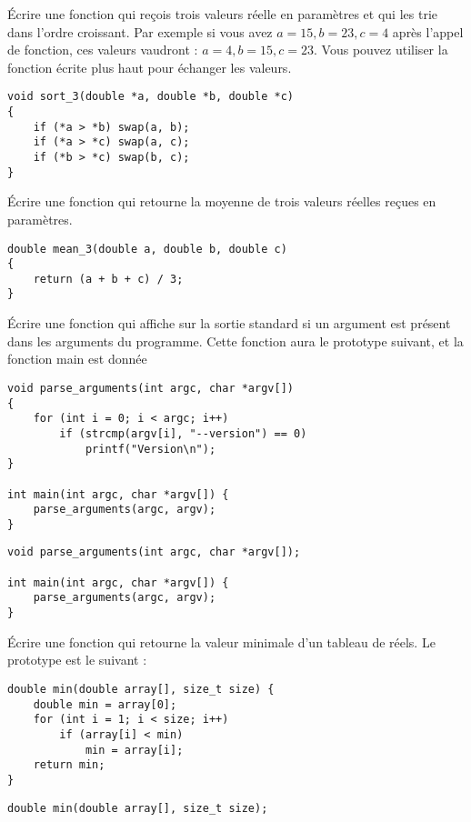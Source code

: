 \documentclass[french,a4paper,addpoints,11pt]{exam}
\begin{document}
\begin{questions}
\question Écrire une fonction qui reçois trois valeurs réelle en paramètres et qui les trie dans l'ordre croissant. Par exemple si vous avez $a=15, b=23, c=4$ après l'appel de fonction, ces valeurs vaudront : $a=4, b=15, c=23$. Vous pouvez utiliser la fonction  écrite plus haut pour échanger les valeurs.

\begin{solutionordottedlines}[7cm]
\begin{lstlisting}
void sort_3(double *a, double *b, double *c)
{
    if (*a > *b) swap(a, b);
    if (*a > *c) swap(a, c);
    if (*b > *c) swap(b, c);
}
\end{lstlisting}
\end{solutionordottedlines}

\question Écrire une fonction qui retourne la moyenne de trois valeurs réelles reçues en paramètres.

\begin{solutionordottedlines}[6cm]
\begin{lstlisting}
double mean_3(double a, double b, double c)
{
    return (a + b + c) / 3;
}
\end{lstlisting}
\end{solutionordottedlines}

\question Écrire une fonction qui affiche  sur la sortie standard si un argument  est présent dans les arguments du programme. Cette fonction aura le prototype suivant, et la fonction main est donnée

\ifprintanswers
\begin{solution}
\begin{lstlisting}
void parse_arguments(int argc, char *argv[])
{
    for (int i = 0; i < argc; i++)
        if (strcmp(argv[i], "--version") == 0)
            printf("Version\n");
}

int main(int argc, char *argv[]) {
    parse_arguments(argc, argv);
}
\end{lstlisting}
\end{solution}
\else
\begin{lstlisting}
void parse_arguments(int argc, char *argv[]);

int main(int argc, char *argv[]) {
    parse_arguments(argc, argv);
}
\end{lstlisting}
\fillwithdottedlines{8cm}
\fi

\question Écrire une fonction qui retourne la valeur minimale d'un tableau de réels. Le prototype est le suivant :

\ifprintanswers
\begin{solution}
\begin{lstlisting}
double min(double array[], size_t size) {
    double min = array[0];
    for (int i = 1; i < size; i++)
        if (array[i] < min)
            min = array[i];
    return min;
}
\end{lstlisting}
\end{solution}
\else
\begin{lstlisting}
double min(double array[], size_t size);
\end{lstlisting}
\fillwithdottedlines{8cm}
\fi


\end{questions}
\end{document}
